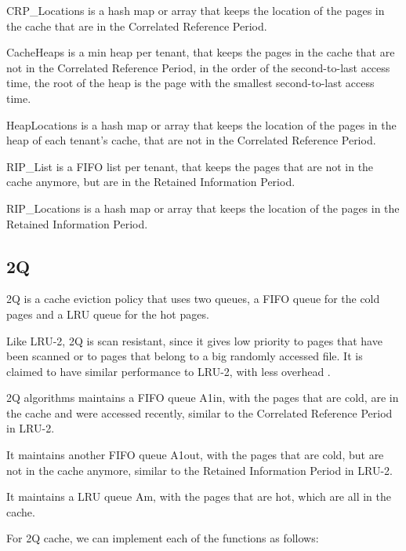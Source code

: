 CRP\_Locations is a hash map or array that keeps the location of the pages in the cache
that are in the Correlated Reference Period.

CacheHeaps is a min heap per tenant, that keeps the pages in the cache that are not in the
Correlated Reference Period, in the order of the second-to-last access time, the root of
the heap is the page with the smallest second-to-last access time.

HeapLocations is a hash map or array that keeps the location of the pages in the heap 
of each tenant's cache, that are not in the Correlated Reference Period.

RIP\_List is a FIFO list per tenant, that keeps the pages that are not in the cache anymore, 
but are in the Retained Information Period.

RIP\_Locations is a hash map or array that keeps the location of the pages in the Retained
Information Period.

\subsection{2Q}

2Q is a cache eviction policy that uses two queues, a FIFO queue for the
cold pages and a LRU queue for the hot pages.

Like LRU-2, 2Q is scan resistant, since it gives low priority to pages that have been
scanned or to pages that belong to a big randomly accessed file. It
is claimed to have similar performance to LRU-2, with less overhead \cite{2q-article}.

2Q algorithms maintains a FIFO queue A1in, with the pages that are cold, are in the cache
and were accessed recently, similar to the Correlated Reference Period in LRU-2.

It maintains another FIFO queue A1out, with the pages that are cold, but are not in 
the cache anymore, similar to the Retained Information Period in LRU-2.

It maintains a LRU queue Am, with the pages that are hot, which are all in the cache.

For 2Q cache, we can implement each of the functions as follows:

